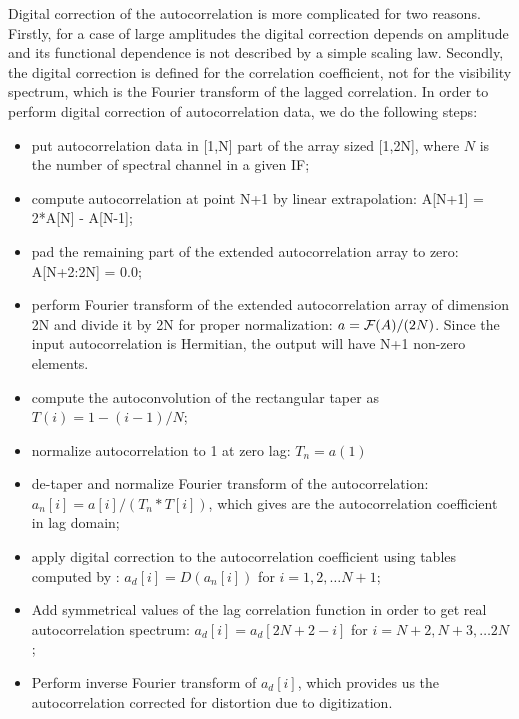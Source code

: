 \documentclass[11pt]{article}
\begin{document}
  Digital correction of the autocorrelation is more complicated for two 
reasons. Firstly, for a case of large amplitudes the digital correction
depends on amplitude and its functional dependence is not described by
a simple scaling law. Secondly, the digital correction is defined for 
the correlation coefficient, not for the visibility spectrum, which
is the Fourier transform of the lagged correlation. In order to perform
digital correction of autocorrelation data, we do the following steps:
%
\begin{itemize}
    \item put autocorrelation data in [1,N] part of the array
          sized [1,2N], where $N$ is the number of spectral channel
          in a given IF;

    \item compute autocorrelation at point N+1 by linear extrapolation:
          A[N+1] = 2*A[N] - A[N-1];

    \item pad the remaining part of the extended autocorrelation array 
          to zero: A[N+2:2N] = 0.0;

    \item perform Fourier transform of the extended autocorrelation 
          array of dimension 2N and divide it by 2N for proper
          normalization: $a = {\cal F}(A)/(2N)$. Since the input
          autocorrelation is Hermitian, the output will have N+1
          non-zero elements.

    \item compute the autoconvolution of the rectangular taper as
          $T(i) = 1 - (i-1)/N$;

    \item normalize autocorrelation to 1 at zero lag: $T_n = a(1)$

    \item de-taper and normalize Fourier transform of the autocorrelation:
          $a_n[i] = a[i]/(T_n*T[i])$, which gives are the autocorrelation
          coefficient in lag domain;

    \item apply digital correction to the autocorrelation coefficient
          using tables computed by \citet{r:kog_mem5}:
          $a_d[i] = D(a_n[i])$ for $i=1,2, \ldots N+1$;
          
    \item Add symmetrical values of the lag correlation function in order
          to get real autocorrelation spectrum:
          $a_d[i] = a_d[2N+2-i]$ for $i=N+2,N+3, \ldots 2N$;

    \item Perform inverse Fourier transform of $a_d[i]$, which provides
          us the autocorrelation corrected for distortion due to digitization.
\end{itemize}
\end{document}
